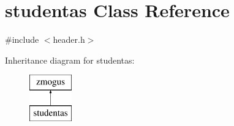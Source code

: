 \hypertarget{classstudentas}{}\section{studentas Class Reference}
\label{classstudentas}


{\ttfamily \#include $<$header.\+h$>$}

Inheritance diagram for studentas\+:\begin{figure}[H]
\begin{center}
\leavevmode
\includegraphics[height=2.000000cm]{classstudentas}
\end{center}
\end{figure}
